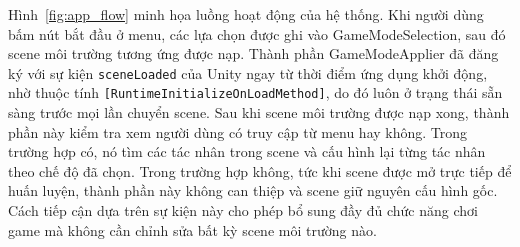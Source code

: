 \indent Hình~\ref{fig:app_flow} minh họa luồng hoạt động của hệ thống. Khi người dùng bấm
nút bắt đầu ở menu, các lựa chọn được ghi vào GameModeSelection, sau đó scene môi
trường tương ứng được nạp. Thành phần GameModeApplier đã đăng ký với sự kiện
\texttt{sceneLoaded} của Unity ngay từ thời điểm ứng dụng khởi động, nhờ thuộc tính
\texttt{[Runtime\allowbreak Initialize\allowbreak On\allowbreak Load\allowbreak Method]},
do đó luôn ở trạng thái sẵn sàng trước mọi lần chuyển scene. Sau khi scene môi trường được
nạp xong, thành phần này kiểm tra xem người dùng có truy cập từ menu hay không. Trong
trường hợp có, nó tìm các tác nhân trong scene và cấu hình lại từng tác nhân theo chế độ
đã chọn. Trong trường hợp không, tức khi scene được mở trực tiếp để huấn luyện, thành phần
này không can thiệp và scene giữ nguyên cấu hình gốc. Cách tiếp cận dựa trên sự kiện này
cho phép bổ sung đầy đủ chức năng chơi game mà không cần chỉnh sửa bất kỳ scene môi trường
nào.


